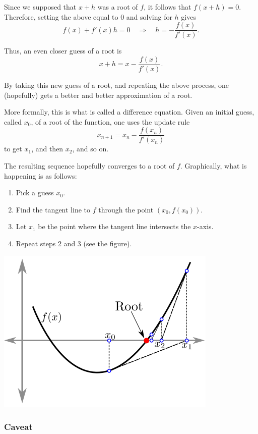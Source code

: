 \documentclass[twoside,openright,titlepage,a4paper]{book}
\begin{document}
\begin{sloppypar}
Since we supposed that $x+h$ was a root of $f$, it follows that $f(x+h)=0$. Therefore, setting the above equal to 0 and solving for $h$ gives \[ f(x) + f'(x)h = 0 \quad \Rightarrow \quad h = -\frac{f(x)}{f'(x)}. \]

Thus, an even closer guess of a root is \[ x + h = x - \frac{f(x)}{f'(x)}. \]

By taking this new guess of a root, and repeating the above process, one (hopefully) gets a better and better approximation of a root.

More formally, this is what is called a difference equation. Given an initial guess, called $x_0$, of a root of the function, one uses the update rule
\begin{equation*}
x_{n+1} = x_n - \frac{f(x_n)}{f'(x_n)}
\end{equation*}
to get $x_1$, and then $x_2$, and so on.

The resulting sequence hopefully converges to a root of $f$. Graphically, what is happening is as follows:
\begin{enumerate}
\item Pick a guess $x_0$.
\item Find the tangent line to $f$ through the point $(x_0,f(x_0))$.
\item Let $x_1$ be the point where the tangent line intersects the $x$-axis.
\item Repeat steps 2 and 3 (see the figure).
\end{enumerate}
\begin{center}\includegraphics[scale=0.6]{NewtonsMethod}\end{center}

\subsubsection{Caveat}


\end{sloppypar}
\end{document}
